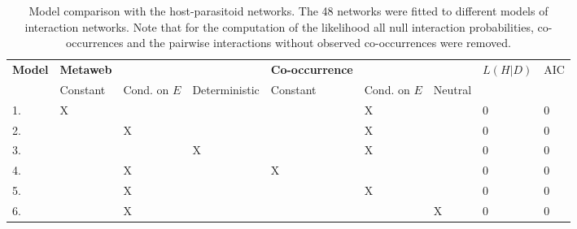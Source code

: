 \documentclass[12pt]{article}
\begin{document}
\newpage


\begin{table}
\centering
\begin{tabular}{lllllllll}
\hline
\textbf{Model} & \textbf{Metaweb} & & & \textbf{Co-occurrence} & & & \textbf{$L(H|D)$} & AIC\\
& Constant & Cond. on $E$ & Deterministic & Constant & Cond. on $E$ & Neutral & & \\
\hline
1. & X & & & & X & & 0 & 0 \\
2. & & X & & & X & & 0 & 0 \\
3. & & & X & & X & & 0 & 0 \\
4. & & X & & X & & & 0 & 0 \\
5. & & X & & & X & & 0 & 0 \\
6. & & X & & & & X & 0 & 0 \\
\hline
\end{tabular}
\caption{Model comparison with the host-parasitoid networks. The 48 networks were fitted to different models of interaction networks. Note that for the computation of the likelihood all null interaction probabilities, co-occurrences and the pairwise interactions without observed co-occurrences were removed.
}
\end{table}
\end{document}
